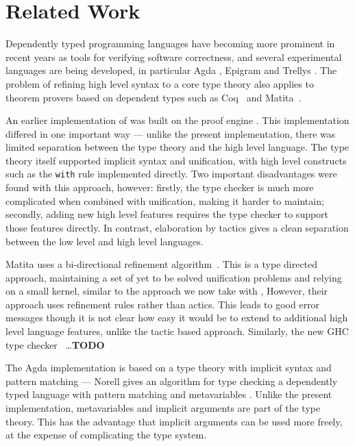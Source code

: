\section{Related Work}

\label{sect:related}

Dependently typed programming languages have becoming more prominent in recent
years as tools for verifying software correctness, and several experimental
languages are being developed, in particular Agda \cite{norell2007thesis},
Epigram \cite{McBride2004a,Levitation2010} and Trellys \cite{Kimmell2012}.
The problem of refining high level syntax to a core type theory also applies
to theorem provers based on dependent types such as Coq~\cite{Bertot2004}
and Matita~\cite{Asperti2011}.

An earlier implementation of \Idris{} was built on the \Ivor{} proof engine
\cite{Brady2006b}. This implementation differed in one important way --- unlike
the present implementation, there was limited separation between the type
theory and the high level language. The type theory itself supported implicit
syntax and unification, with high level constructs such as the \texttt{with}
rule implemented directly. Two important disadvantages were found with this
approach, however: firstly, the type checker is much more complicated when
combined with unification, making it harder to maintain; secondly, adding new
high level features requires the type checker to support those features
directly. In contrast, elaboration by tactics gives a clean separation between
the low level and high level languages.

Matita uses a bi-directional refinement algorithm~\cite{Asperti}. This is a
type directed approach, maintaining a set of yet to be solved unification
problems and relying on a small kernel, similar to the approach we now take
with \Idris{}, However, their approach uses refinement rules rather than
actics. This leads to good error messages though it is not clear how
easy it would be to extend to additional high level language features, unlike
the tactic based approach.
Similarly, the new GHC type checker~\cite{Vytiniotis2011} \ldots \textbf{TODO}

The Agda implementation is based on a type theory with
implicit syntax and pattern matching --- Norell gives an algorithm for type checking
a dependently typed language with pattern matching and metavariables 
\cite{norell2007thesis}. Unlike the present \Idris{} implementation, metavariables
and implicit arguments are part of the type theory. This has the advantage that
implicit arguments can be used more freely, at the expense of complicating the type
system.

